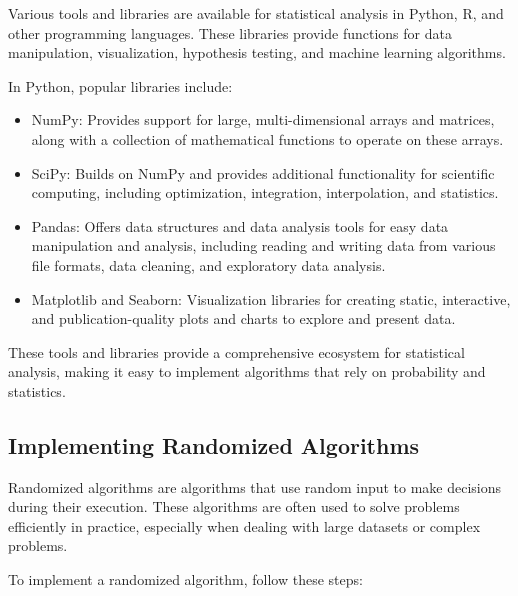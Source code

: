 \documentclass[12pt]{book} %
\begin{document}
Various tools and libraries are available for statistical analysis in Python, R, and other programming languages. These libraries provide functions for data manipulation, visualization, hypothesis testing, and machine learning algorithms.

In Python, popular libraries include:

\begin{itemize}
    \item NumPy: Provides support for large, multi-dimensional arrays and matrices, along with a collection of mathematical functions to operate on these arrays.
    \item SciPy: Builds on NumPy and provides additional functionality for scientific computing, including optimization, integration, interpolation, and statistics.
    \item Pandas: Offers data structures and data analysis tools for easy data manipulation and analysis, including reading and writing data from various file formats, data cleaning, and exploratory data analysis.
    \item Matplotlib and Seaborn: Visualization libraries for creating static, interactive, and publication-quality plots and charts to explore and present data.
\end{itemize}

These tools and libraries provide a comprehensive ecosystem for statistical analysis, making it easy to implement algorithms that rely on probability and statistics.

\subsection{Implementing Randomized Algorithms}

Randomized algorithms are algorithms that use random input to make decisions during their execution. These algorithms are often used to solve problems efficiently in practice, especially when dealing with large datasets or complex problems.

To implement a randomized algorithm, follow these steps:
\end{document}
